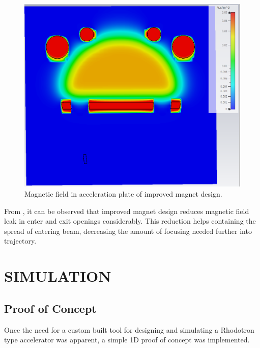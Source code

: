 \documentclass[a4paper,oneside,12pt]{report}
\numberwithin{equation}{chapter}
\begin{document}
\begin{figure}[H]
    \centering
    \captionsetup{justification=centering}
    \includegraphics[width=.8\linewidth]{./figures/cst/cst_second_magnet_design4.png}
    \caption{Magnetic field in acceleration plate of improved magnet design.}
    \label{fig:improved_magnet_design_B}
\end{figure}
From , it can be observed that improved magnet design reduces magnetic field leak in enter and exit openings considerably. 
This reduction helps containing the spread of entering beam, decreasing the amount of focusing needed further into trajectory. 




\newpage


\chapter{SIMULATION}
\section{Proof of Concept}
Once the need for a custom built tool for designing and simulating a Rhodotron type accelerator was apparent, a simple 1D proof of concept was implemented.
\end{document}
